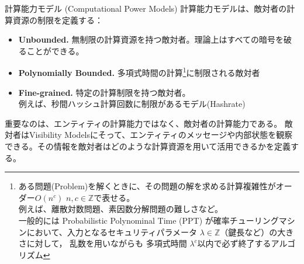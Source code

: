 \documentclass[aspectratio=169,10pt]{beamer}
\newenvironment{outlineblock}[1][]
{\begin{tcolorbox}[colframe=black, colback=white, boxrule=1pt, boxsep=5pt]}
{\end{tcolorbox}}
\begin{document}
\begin{frame}{計算能力モデル (Computational Power Models)}
計算能力モデルは、敵対者の計算資源の制限を定義する：


\begin{itemize}
    \item \textbf{Unbounded. }無制限の計算資源を持つ敵対者。理論上はすべての暗号を破ることができる。\\
    
    \item \textbf{Polynomially Bounded. }多項式時間の計算\footnote{
    ある問題(Problem)を解くときに、その問題の解を求める計算複雑性がオーダー$O(n^c)$ $n, c \in \mathbb{Z}$で表せる。\\
    例えば、離散対数問題、素因数分解問題の難しさなど。\\
    一般的には Probabilistic Polynominal Time (PPT) が確率チューリングマシンにおいて、入力となるセキュリティパラメータ $\lambda \in \mathbb{Z}$（鍵長など）の大きさに対して， 乱数を用いながらも 多項式時間 $\lambda^c$以内で必ず終了するアルゴリズム}に制限される敵対者
    
    \item \textbf{Fine-grained. }特定の計算制限を持つ敵対者。\\
    例えば、秒間ハッシュ計算回数に制限があるモデル(Hashrate)
\end{itemize}

\vspace{0.5em}

\begin{outlineblock}[]
重要なのは、エンティティの計算能力ではなく、敵対者の計算能力である。
敵対者はVisibility Modelsにそって、エンティティのメッセージや内部状態を観察できる。その情報を敵対者はどのような計算資源を用いて活用できるかを定義する。
\end{outlineblock}
\end{frame}
\end{document}
